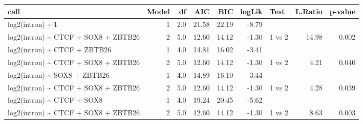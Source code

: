 \begin{table}[ht]
\centering
\begin{tabular}{lrrrrrlrr}
  \hline
call & Model & df & AIC & BIC & logLik & Test & L.Ratio & p-value \\ 
  \hline
log2(intron) \~{} 1 &  1 & 2.0 & 21.58 & 22.19 & -8.79 &  &  &  \\ 
  log2(intron) \~{} CTCF + SOX8 + ZBTB26 &  2 & 5.0 & 12.60 & 14.12 & -1.30 & 1 vs 2 & 14.98 & 0.002 \\ 
   \hline
log2(intron) \~{} CTCF + ZBTB26 &  1 & 4.0 & 14.81 & 16.02 & -3.41 &  &  &  \\ 
  log2(intron) \~{} CTCF + SOX8 + ZBTB26 &  2 & 5.0 & 12.60 & 14.12 & -1.30 & 1 vs 2 & 4.21 & 0.040 \\ 
   \hline
log2(intron) \~{} SOX8 + ZBTB26 &  1 & 4.0 & 14.89 & 16.10 & -3.44 &  &  &  \\ 
  log2(intron) \~{} CTCF + SOX8 + ZBTB26 &  2 & 5.0 & 12.60 & 14.12 & -1.30 & 1 vs 2 & 4.28 & 0.039 \\ 
   \hline
log2(intron) \~{} CTCF + SOX8 &  1 & 4.0 & 19.24 & 20.45 & -5.62 &  &  &  \\ 
  log2(intron) \~{} CTCF + SOX8 + ZBTB26 &  2 & 5.0 & 12.60 & 14.12 & -1.30 & 1 vs 2 & 8.63 & 0.003 \\ 
   \hline
\end{tabular}
\end{table}
